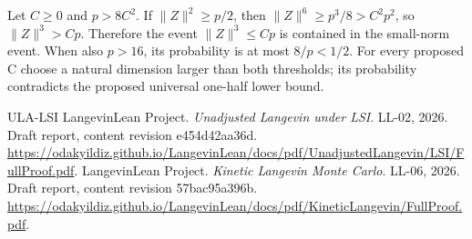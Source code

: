 \documentclass[11pt,a4paper]{article}
\begin{document}
Let \(C\ge0\) and \(p>8C^2\). If \(\|Z\|^2\ge p/2\), then \(\|Z\|^6\ge p^3/8>C^2p^2\), so \(\|Z\|^3>Cp\). Therefore the event \(\|Z\|^3\le Cp\) is contained in the small-norm event. When also \(p>16\), its probability is at most \(8/p<1/2\). For every proposed C choose a natural dimension larger than both thresholds; its probability contradicts the proposed universal one-half lower bound.


\begin{thebibliography}{ULA-LSI}
LangevinLean Project. \emph{Unadjusted Langevin under LSI}. LL-02, 2026. Draft report, content revision e454d42aa36d. \url{https://odakyildiz.github.io/LangevinLean/docs/pdf/UnadjustedLangevin/LSI/FullProof.pdf}.
LangevinLean Project. \emph{Kinetic Langevin Monte Carlo}. LL-06, 2026. Draft report, content revision 57bac95a396b. \url{https://odakyildiz.github.io/LangevinLean/docs/pdf/KineticLangevin/FullProof.pdf}.
\end{thebibliography}
\end{document}
